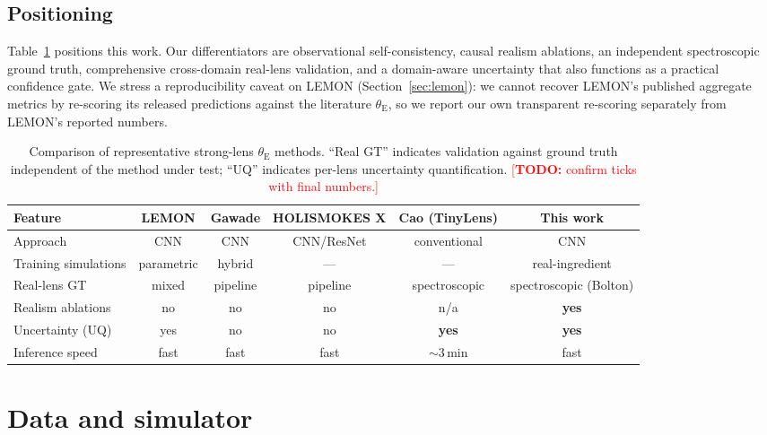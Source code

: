 \documentclass[fleqn,usenatbib]{mnras}
\newcommand{\thetaE}{\theta_{\mathrm{E}}}
\newcommand{\todo}[1]{\textcolor{red}{[\textbf{TODO:} #1]}}
\begin{document}
\subsection{Positioning}
Table~\ref{tab:comparison} positions this work. Our differentiators are
observational self-consistency, causal realism ablations, an independent
spectroscopic ground truth, comprehensive cross-domain real-lens validation,
and a domain-aware uncertainty that also functions as a practical confidence
gate. We stress a reproducibility caveat on LEMON
(Section~\ref{sec:lemon}): we cannot recover LEMON's published aggregate
metrics by re-scoring its released predictions against the literature
$\thetaE$, so we report our own transparent re-scoring separately from LEMON's
reported numbers.

\begin{table}
\centering
\caption{Comparison of representative strong-lens $\thetaE$ methods. ``Real GT''
indicates validation against ground truth independent of the method under test;
``UQ'' indicates per-lens uncertainty quantification. \todo{confirm ticks with
final numbers.}}
\label{tab:comparison}
\begin{tabular}{lccccc}
\toprule
Feature & LEMON & Gawade & HOLISMOKES X & Cao (TinyLens) & \textbf{This work} \\
\midrule
Approach            & CNN        & CNN       & CNN/ResNet & conventional & CNN \\
Training simulations& parametric & hybrid    & ---        & ---          & real-ingredient \\
Real-lens GT        & mixed      & pipeline  & pipeline   & spectroscopic& spectroscopic (Bolton) \\
Realism ablations   & no         & no        & no         & n/a          & \textbf{yes} \\
Uncertainty (UQ)    & yes        & no        & no         & \textbf{yes} & \textbf{yes} \\
Inference speed     & fast       & fast      & fast       & ${\sim}3$\,min & fast \\
\bottomrule
\end{tabular}
\end{table}

\section{Data and simulator}
\label{sec:data}
\end{document}
